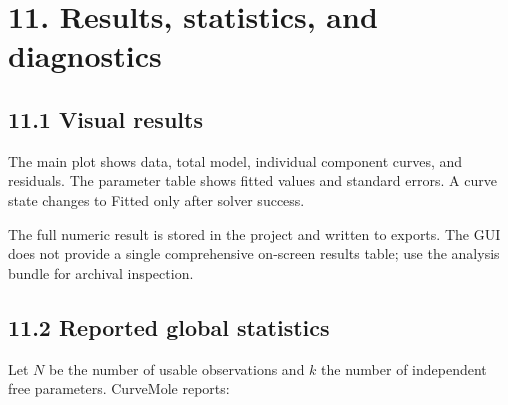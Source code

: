 \documentclass[
  10pt,
  a4paper,
  oneside]{scrreprt}
\begin{document}
\hypertarget{results-statistics-and-diagnostics}{%
\chapter{11. Results, statistics, and
diagnostics}\label{results-statistics-and-diagnostics}}

\hypertarget{visual-results}{%
\section{11.1 Visual results}\label{visual-results}}

The main plot shows data, total model, individual component curves, and
residuals. The parameter table shows fitted values and standard errors.
A curve state changes to Fitted only after solver success.

The full numeric result is stored in the project and written to exports.
The GUI does not provide a single comprehensive on-screen results table;
use the analysis bundle for archival inspection.

\hypertarget{reported-global-statistics}{%
\section{11.2 Reported global
statistics}\label{reported-global-statistics}}

Let \(N\) be the number of usable observations and \(k\) the number of
independent free parameters. CurveMole reports:
\end{document}
